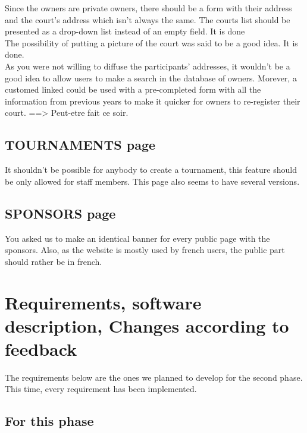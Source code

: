 \documentclass[a4paper, 12pt]{article}
\begin{document}
Since the owners are private owners, there should be a form with their address and the court's address which isn't always the same. The courts list should be presented as a drop-down list instead of an empty field. It is done\\

The possibility of putting a picture of the court was said to be a good idea. It is done. \\

As you were not willing to diffuse the participants' addresses, it wouldn't be a good idea to allow users to make a search in the database of owners. Morever, a customed linked could be used with a pre-completed form with all the information from previous years to make it quicker for owners to re-register their court. ==> Peut-etre fait ce soir. 

\subsection*{TOURNAMENTS page}
It shouldn't be possible for anybody to create a tournament, this feature should be only allowed for staff members. This page also seems to have several versions. 

\subsection*{SPONSORS page}

You asked us to make an identical banner for every public page with the sponsors. Also, as the website is mostly used by french users, the public part should rather be in french.

 
\section{Requirements, software description, Changes according to feedback}

The requirements below are the ones we planned to develop for the second phase. This time, every requirement has been implemented. \\
\subsection{For this phase}
	
\end{document}
